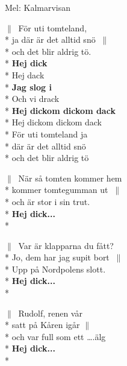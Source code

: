\begin{SongText}[Tomtevisan]
    \begin{SongVerse}
        Mel: Kalmarvisan
    \end{SongVerse}
    \begin{SongVerse}
        $\|\:$ För uti tomteland,\\*%
        ja där är det alltid snö $\:\|$\\*%
        och det blir aldrig tö.\\*%
        \textbf{Hej dick}\\*%
        Hej dack\\*%
        \textbf{Jag slog i}\\*%
        Och vi drack\\*%
        \textbf{Hej dickom dickom dack }\\*%
        Hej dickom dickom dack\\*%
        För uti tomteland ja\\*%
        där är det alltid snö\\*%
        och det blir aldrig tö
    \end{SongVerse}
    \begin{SongVerse}
        $\|\:$ När så tomten kommer hem\\*%
        kommer tomtegumman ut $\:\|$\\*%
        och är stor i sin trut.\\*%
        \textbf{Hej dick...}\\*%
    \end{SongVerse}
    \begin{SongVerse}
        $\|\:$ Var är klapparna du fått?\\*%
        Jo, dem har jag supit bort $\:\|$\\*%
        Upp på Nordpolens slott.\\*%
        \textbf{Hej dick...}\\*%
    \end{SongVerse}
    \begin{SongVerse}
        $\|\:$ Rudolf, renen vår\\*%
        satt på Kåren igår $\|\:$\\*%
        och var full som ett ….älg\\*%
        \textbf{Hej dick...}\\*%
    \end{SongVerse}
    \begin{SongVerse}
    \end{SongVerse}
\end{SongText}
